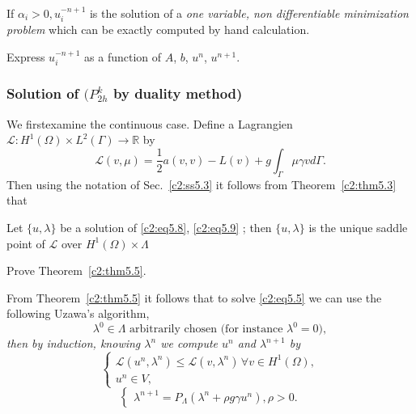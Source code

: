 \begin{remark}\label{c2:rem5.9}%
If $\alpha_i > 0 , u^{-n + 1}_i$ is the solution of a {\em one
  variable, non differentiable minimization problem} which can be
exactly computed by hand calculation.  
\end{remark}

\begin{exercise}\label{c2:exer5.3}%
Express $u^{-n+1}_i$ as a function of $A$, $b$, $u^n$, $u^{n+1}$. 
\end{exercise}

\subsubsection{Solution of $(P^k_{2h}$ by duality
  method)}\label{c2:sss5.6.2} 

We first\pageoriginale  examine the continuous case. Define a Lagrangien
$\mathscr{L}: H^1 (\Omega) \times L^2 (\Gamma) \to \mathbb{R}$ by   
\begin{equation}
\mathscr{L}(v, \mu) = \frac{1}{2} a(v, v)- L (v) + g \int_\Gamma \mu
\gamma v d \Gamma . \tag{5.47}\label{c2:eq5.47} 
\end{equation}
Then using the notation of Sec.~\ref{c2:ss5.3} it follows from 
Theorem~\ref{c2:thm5.3} that   

\begin{theorem}\label{c2:thm5.5}%
Let $\{u, \lambda \}$ be a solution of \eqref{c2:eq5.8},
\eqref{c2:eq5.9} ; then $\{u, \lambda\}$ is the unique saddle point of
$\mathscr{L}$ over $H^1 (\Omega) \times \Lambda$ 
\end{theorem}

\begin{exercise}\label{c2:exer5.4}%
Prove Theorem~\ref{c2:thm5.5}.

From Theorem~\ref{c2:thm5.5} it follows that to solve \eqref{c2:eq5.5}
we can use the following Uzawa's algorithm,  
\begin{equation}
\lambda^0 \in \Lambda  \text{ arbitrarily chosen (for instance  }
\lambda^0 = 0 ), \tag{5.48}\label{c2:eq5.48} 
\end{equation}
\textit{ then by induction, knowing $\lambda^n$ we compute $u^n$ and $\lambda^{n +1}$ by }
\begin{equation}
\begin{cases}
\mathscr{L}(u^n, \lambda^n) \leq \mathscr{L} (v, \lambda^n )\, \forall  v
\in H^1 (\Omega ), \\ 
u^n \in V, 
\end{cases}
\tag{5.49}\label{c2:eq5.49}
\end{equation}
\begin{equation}
\begin{cases}
\lambda^{n+1} = P_\Lambda  (\lambda^n + \rho g \gamma u^n ), \rho >
0. \tag{5.50}\label{c2:eq5.50} 
\end{cases}
\end{equation}
\end{exercise}

